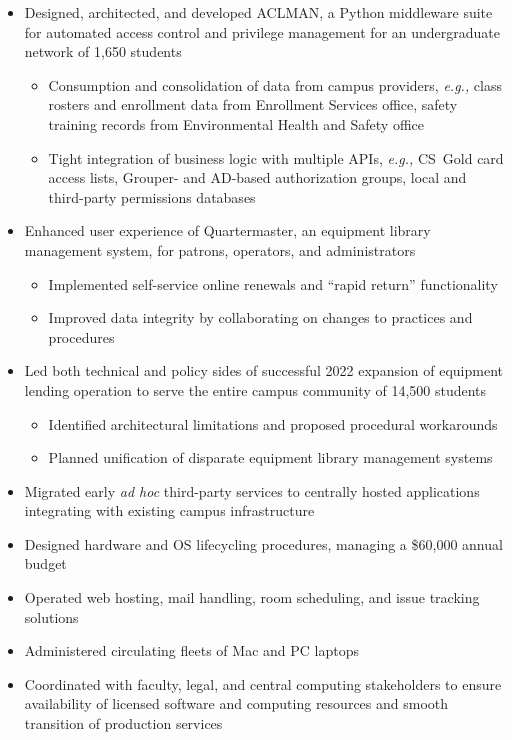\documentclass[11pt]{article}
\begin{document}
\begin{itemize}
	\item Designed, architected, and developed ACLMAN,
		a Python middleware suite for automated
		access control and privilege management
		for an undergraduate network of 1,650 students
		\begin{itemize}
			\item Consumption and consolidation of data from campus providers, \emph{e.g.,}
				class rosters and enrollment data from Enrollment Services office,
				safety training records from Environmental Health and Safety office
			\item Tight integration of business logic with multiple APIs, \emph{e.g.,}
				CS~Gold card access lists,
				Grouper- and AD-based authorization groups,
				local and third-party permissions databases
		\end{itemize}
	\item Enhanced user experience of Quartermaster,
		an equipment library management system,
		for patrons, operators, and administrators
		\begin{itemize}
			\item Implemented self-service online renewals
				and ``rapid return'' functionality
			\item Improved data integrity by collaborating on
				changes to practices and procedures
		\end{itemize}
	\item Led both technical and policy sides of
		successful 2022 expansion of equipment lending operation
		to serve the entire campus community
		of 14,500 students
		\begin{itemize}
			\item Identified architectural limitations
				and proposed procedural workarounds
			\item Planned unification of disparate
				equipment library management systems
		\end{itemize}
	\item Migrated early \emph{ad hoc} third-party services
		to centrally hosted applications
		integrating with existing campus infrastructure
	\item Designed hardware and OS lifecycling procedures,
		managing a \$60,000 annual budget
	\item Operated web hosting, mail handling,
		room scheduling, and issue tracking solutions
	\item Administered circulating fleets of Mac and PC laptops
	\item Coordinated with faculty, legal, and central computing stakeholders
		to ensure availability of licensed software and computing resources
		and smooth transition of production services
\end{itemize}
\end{document}
